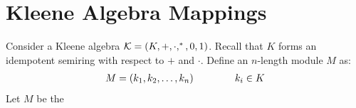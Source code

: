 \section{Kleene Algebra Mappings}
Consider a Kleene algebra
\(\mathcal{K} = \left(K, +, \cdot, ^\ast, 0, 1\right)\).
Recall that \(K\) forms an idempotent semiring with respect to
\(+\) and \(\cdot\).
Define an \(n\)-length module \(M\) as:
\begin{align*}
  M = \left(k_1, k_2, \ldots, k_n\right)
  \qquad
  \qquad
  k_i \in K
\end{align*}
Let \(M\) be the 


